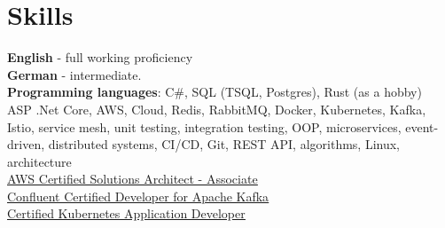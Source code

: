 \documentclass[letterpaper,11pt]{article}
\begin{document}
\section{Skills}
 \begin{itemize}[leftmargin=0.15in, label={}]
    \small{\item{
     \textbf{English}{ - full working proficiency} \\
     \textbf{German}{ - intermediate.} \\

     \textbf{Programming languages}{: C\#, SQL (TSQL, Postgres), Rust (as a hobby)} \\
     ASP .Net Core, AWS, Cloud, Redis, RabbitMQ, Docker, Kubernetes, Kafka, Istio, service mesh,
     unit testing, integration testing, OOP, microservices, event-driven, distributed systems, CI/CD, Git, 
     REST API, algorithms, Linux, architecture \\
     \href{https://www.credly.com/earner/earned/badge/667372fc-1f37-4743-8fe2-60b88c371f6e}{\underline{AWS Certified Solutions Architect - Associate}} \\
     \href{https://www.credential.net/ca157eb4-f685-43ed-a368-1d3c0944dde1}{\underline{Confluent Certified Developer for Apache Kafka}} \\
     \href{https://www.credly.com/badges/3649b5ba-fcf4-4a2b-a32a-0c798421e6ba}{\underline{Certified Kubernetes Application Developer}}
    }}
 \end{itemize}
\end{document}
